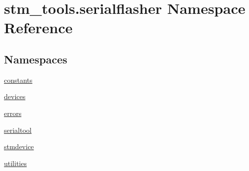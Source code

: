 \hypertarget{namespacestm__tools_1_1serialflasher}{}\section{stm\+\_\+tools.\+serialflasher Namespace Reference}
\label{namespacestm__tools_1_1serialflasher}
\subsection*{Namespaces}
\begin{DoxyCompactItemize}
\item 
 \hyperlink{namespacestm__tools_1_1serialflasher_1_1constants}{constants}
\item 
 \hyperlink{namespacestm__tools_1_1serialflasher_1_1devices}{devices}
\item 
 \hyperlink{namespacestm__tools_1_1serialflasher_1_1errors}{errors}
\item 
 \hyperlink{namespacestm__tools_1_1serialflasher_1_1serialtool}{serialtool}
\item 
 \hyperlink{namespacestm__tools_1_1serialflasher_1_1stmdevice}{stmdevice}
\item 
 \hyperlink{namespacestm__tools_1_1serialflasher_1_1utilities}{utilities}
\end{DoxyCompactItemize}
